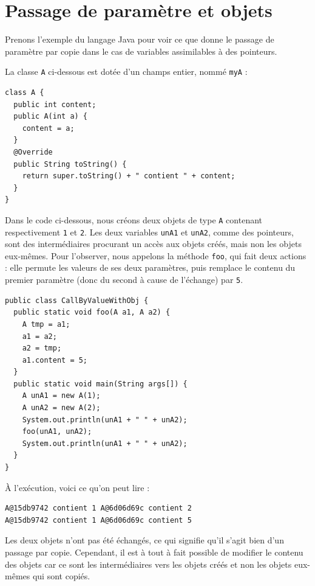 \documentclass[a4paper,francais]{insalyon}
\begin{document}


\section{Passage de paramètre et objets}
\label{a:passage}

Prenons l'exemple du langage Java pour voir ce que donne le passage de paramètre par copie dans le cas de variables assimilables à des pointeurs. 

La classe \texttt{A} ci-dessous est dotée d'un champs entier, nommé \texttt{myA} :
\begin{verbatim}
class A {
  public int content;
  public A(int a) {
    content = a;
  }
  @Override
  public String toString() {
    return super.toString() + " contient " + content; 
  }
}
\end{verbatim}

Dans le code ci-dessous, nous créons deux objets de type \texttt{A} contenant respectivement \texttt{1} et \texttt{2}. Les deux variables \texttt{unA1} et \texttt{unA2}, comme des pointeurs, sont des intermédiaires procurant un accès aux objets créés, mais non les objets eux-mêmes. Pour l'observer, nous appelons la méthode \texttt{foo}, qui fait deux actions : elle permute les valeurs de ses deux paramètres, puis remplace le contenu du premier paramètre (donc du second à cause de l'échange) par \texttt{5}. 

\begin{verbatim}
public class CallByValueWithObj {
  public static void foo(A a1, A a2) {
    A tmp = a1;
    a1 = a2;
    a2 = tmp;
    a1.content = 5;
  }
  public static void main(String args[]) {
    A unA1 = new A(1);
    A unA2 = new A(2);
    System.out.println(unA1 + " " + unA2);
    foo(unA1, unA2);	
    System.out.println(unA1 + " " + unA2);	
  }
}
\end{verbatim}

\`A l'exécution, voici ce qu'on peut lire :

\begin{verbatim}
A@15db9742 contient 1 A@6d06d69c contient 2
A@15db9742 contient 1 A@6d06d69c contient 5
\end{verbatim}

Les deux objets n'ont pas été échangés, ce qui signifie qu'il s'agit bien d'un passage par copie. Cependant, il est à tout à fait possible de modifier le contenu des objets car ce sont les intermédiaires vers les objets créés et non les objets eux-mêmes qui sont copiés. 



\end{document}
